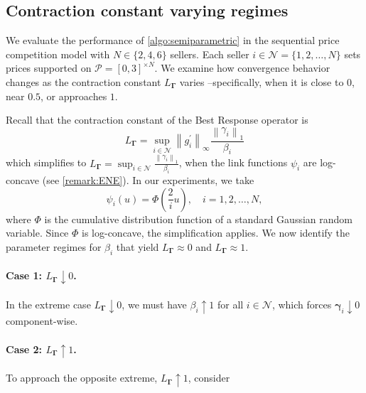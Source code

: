 \documentclass{article} %
\begin{document}
\subsection{Contraction constant varying regimes}\label{sec:contraction_varying_s_i}
We evaluate the performance of \cref{algo:semiparametric} in the sequential price competition model with $N \in \{2,4,6\}$ sellers. Each seller $i \in \mathcal{N}=\{1,2,\dots,N\}$ sets prices supported on $\mathcal{P}=[0,3]^{\times N}$. We examine how convergence behavior changes as the contraction constant $L_{\boldsymbol{\Gamma}}$ varies --specifically, when it is close to $0$, near $0.5$, or approaches $1$.

Recall that the contraction constant of the Best Response operator is
$$
L_{\boldsymbol{\Gamma}} = \sup _{i \in \mathcal{N}}\left\|g_i^{\prime}\right\|_{\infty}\frac{\left\|\gamma_i\right\|_1}{\beta_i}
$$
which simplifies to $L_{\boldsymbol{\Gamma}} = \sup _{i \in \mathcal{N}}\frac{\left\|\gamma_i\right\|_1}{\beta_i}$, when the link functions $\psi_i$ are log-concave (see \cref{remark:ENE}). In our experiments, we take 
$$
\psi_i(u)=\Phi\left(\frac{2}{i} u\right), \quad i=1,2,\dots,N,
$$
where $\Phi$ is the cumulative distribution function of a standard Gaussian random variable. Since $\Phi$ is log-concave, the simplification applies. We now identify the parameter regimes for $\beta_i$ that yield $L_{\boldsymbol{\Gamma}} \approx 0$ and $L_{\boldsymbol{\Gamma}} \approx 1$.

\paragraph{Case 1: $L_{\boldsymbol{\Gamma}} \downarrow 0$.} In the extreme case $L_{\boldsymbol{\Gamma}} \downarrow 0$, we must have $\beta_i \uparrow 1$ for all $i \in \mathcal{N}$, which forces $\boldsymbol{\gamma}_i \downarrow 0$ component-wise.

\paragraph{Case 2: $L_{\boldsymbol{\Gamma}} \uparrow 1$.}

To approach the opposite extreme, $L_{\boldsymbol{\Gamma}} \uparrow 1$, consider
\end{document}
